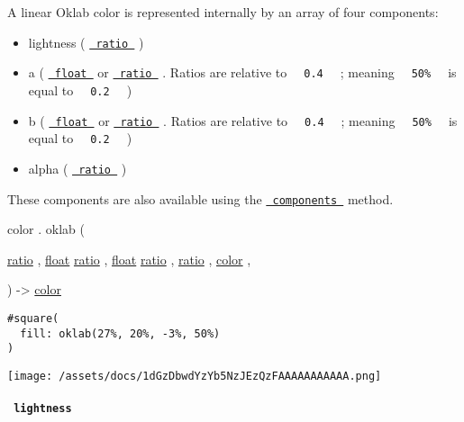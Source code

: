 A linear Oklab color is represented internally by an array of four
components:

\begin{itemize}
\tightlist
\item
  lightness ( \href{/docs/reference/layout/ratio/}{\texttt{\ ratio\ }} )
\item
  a ( \href{/docs/reference/foundations/float/}{\texttt{\ float\ }} or
  \href{/docs/reference/layout/ratio/}{\texttt{\ ratio\ }} . Ratios are
  relative to \texttt{\ }{\texttt{\ 0.4\ }}\texttt{\ } ; meaning
  \texttt{\ }{\texttt{\ 50\%\ }}\texttt{\ } is equal to
  \texttt{\ }{\texttt{\ 0.2\ }}\texttt{\ } )
\item
  b ( \href{/docs/reference/foundations/float/}{\texttt{\ float\ }} or
  \href{/docs/reference/layout/ratio/}{\texttt{\ ratio\ }} . Ratios are
  relative to \texttt{\ }{\texttt{\ 0.4\ }}\texttt{\ } ; meaning
  \texttt{\ }{\texttt{\ 50\%\ }}\texttt{\ } is equal to
  \texttt{\ }{\texttt{\ 0.2\ }}\texttt{\ } )
\item
  alpha ( \href{/docs/reference/layout/ratio/}{\texttt{\ ratio\ }} )
\end{itemize}

These components are also available using the
\href{/docs/reference/visualize/color/\#definitions-components}{\texttt{\ components\ }}
method.

color { . } { oklab } (

{ \href{/docs/reference/layout/ratio/}{ratio} , } {
\href{/docs/reference/foundations/float/}{float}
\href{/docs/reference/layout/ratio/}{ratio} , } {
\href{/docs/reference/foundations/float/}{float}
\href{/docs/reference/layout/ratio/}{ratio} , } {
\href{/docs/reference/layout/ratio/}{ratio} , } {
\href{/docs/reference/visualize/color/}{color} , }

) -\textgreater{} \href{/docs/reference/visualize/color/}{color}

\begin{verbatim}
#square(
  fill: oklab(27%, 20%, -3%, 50%)
)
\end{verbatim}

\texttt{[image: /assets/docs/1dGzDbwdYzYb5NzJEzQzFAAAAAAAAAAA.png]}

\paragraph{\texorpdfstring{\texttt{\ lightness\ }}{ lightness }}\label{definitions-oklab-lightness}

